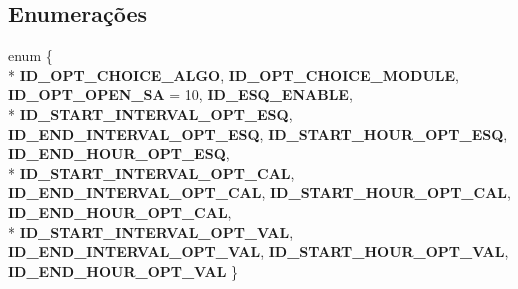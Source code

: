 \subsection*{Enumerações}
\begin{DoxyCompactItemize}
\item 
enum \{ \\*
{\bf I\+D\+\_\+\+O\+P\+T\+\_\+\+C\+H\+O\+I\+C\+E\+\_\+\+A\+L\+GO}, 
{\bf I\+D\+\_\+\+O\+P\+T\+\_\+\+C\+H\+O\+I\+C\+E\+\_\+\+M\+O\+D\+U\+LE}, 
{\bf I\+D\+\_\+\+O\+P\+T\+\_\+\+O\+P\+E\+N\+\_\+\+SA} = 10, 
{\bf I\+D\+\_\+\+E\+S\+Q\+\_\+\+E\+N\+A\+B\+LE}, 
\\*
{\bf I\+D\+\_\+\+S\+T\+A\+R\+T\+\_\+\+I\+N\+T\+E\+R\+V\+A\+L\+\_\+\+O\+P\+T\+\_\+\+E\+SQ}, 
{\bf I\+D\+\_\+\+E\+N\+D\+\_\+\+I\+N\+T\+E\+R\+V\+A\+L\+\_\+\+O\+P\+T\+\_\+\+E\+SQ}, 
{\bf I\+D\+\_\+\+S\+T\+A\+R\+T\+\_\+\+H\+O\+U\+R\+\_\+\+O\+P\+T\+\_\+\+E\+SQ}, 
{\bf I\+D\+\_\+\+E\+N\+D\+\_\+\+H\+O\+U\+R\+\_\+\+O\+P\+T\+\_\+\+E\+SQ}, 
\\*
{\bf I\+D\+\_\+\+S\+T\+A\+R\+T\+\_\+\+I\+N\+T\+E\+R\+V\+A\+L\+\_\+\+O\+P\+T\+\_\+\+C\+AL}, 
{\bf I\+D\+\_\+\+E\+N\+D\+\_\+\+I\+N\+T\+E\+R\+V\+A\+L\+\_\+\+O\+P\+T\+\_\+\+C\+AL}, 
{\bf I\+D\+\_\+\+S\+T\+A\+R\+T\+\_\+\+H\+O\+U\+R\+\_\+\+O\+P\+T\+\_\+\+C\+AL}, 
{\bf I\+D\+\_\+\+E\+N\+D\+\_\+\+H\+O\+U\+R\+\_\+\+O\+P\+T\+\_\+\+C\+AL}, 
\\*
{\bf I\+D\+\_\+\+S\+T\+A\+R\+T\+\_\+\+I\+N\+T\+E\+R\+V\+A\+L\+\_\+\+O\+P\+T\+\_\+\+V\+AL}, 
{\bf I\+D\+\_\+\+E\+N\+D\+\_\+\+I\+N\+T\+E\+R\+V\+A\+L\+\_\+\+O\+P\+T\+\_\+\+V\+AL}, 
{\bf I\+D\+\_\+\+S\+T\+A\+R\+T\+\_\+\+H\+O\+U\+R\+\_\+\+O\+P\+T\+\_\+\+V\+AL}, 
{\bf I\+D\+\_\+\+E\+N\+D\+\_\+\+H\+O\+U\+R\+\_\+\+O\+P\+T\+\_\+\+V\+AL}
 \}
\end{DoxyCompactItemize}
